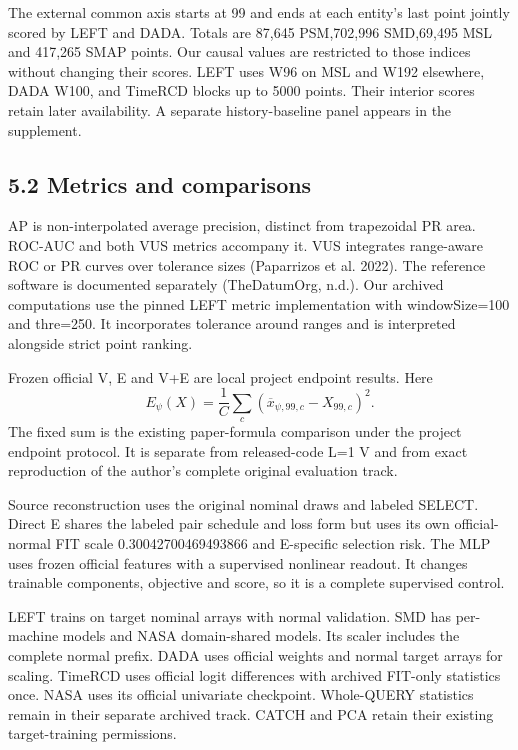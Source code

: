 \documentclass[
  english,
  10pt,
]{article}
\begin{document}
The external common axis starts at 99 and ends at each entity's last
point jointly scored by LEFT and DADA. Totals are 87,645 PSM,702,996
SMD,69,495 MSL and 417,265 SMAP points. Our causal values are restricted
to those indices without changing their scores. LEFT uses W96 on MSL and
W192 elsewhere, DADA W100, and TimeRCD blocks up to 5000 points. Their
interior scores retain later availability. A separate history-baseline
panel appears in the supplement.

\subsection{5.2 Metrics and comparisons}\label{metrics-and-comparisons}

AP is non-interpolated average precision, distinct from trapezoidal PR
area. ROC-AUC and both VUS metrics accompany it. VUS integrates
range-aware ROC or PR curves over tolerance sizes (Paparrizos et al.
2022). The reference software is documented separately (TheDatumOrg,
n.d.). Our archived computations use the pinned LEFT metric
implementation with windowSize=100 and thre=250. It incorporates
tolerance around ranges and is interpreted alongside strict point
ranking.

Frozen official V, E and V+E are local project endpoint results. Here \[
E_\psi(X)=\frac1C\sum_c
(\overline x_{\psi,99,c}-X_{99,c})^2.
\] The fixed sum is the existing paper-formula comparison under the
project endpoint protocol. It is separate from released-code L=1 V and
from exact reproduction of the author's complete original evaluation
track.

Source reconstruction uses the original nominal draws and labeled
SELECT. Direct E shares the labeled pair schedule and loss form but uses
its own official-normal FIT scale 0.30042700469493866 and E-specific
selection risk. The MLP uses frozen official features with a supervised
nonlinear readout. It changes trainable components, objective and score,
so it is a complete supervised control.

LEFT trains on target nominal arrays with normal validation. SMD has
per-machine models and NASA domain-shared models. Its scaler includes
the complete normal prefix. DADA uses official weights and normal target
arrays for scaling. TimeRCD uses official logit differences with
archived FIT-only statistics once. NASA uses its official univariate
checkpoint. Whole-QUERY statistics remain in their separate archived
track. CATCH and PCA retain their existing target-training permissions.
\end{document}
